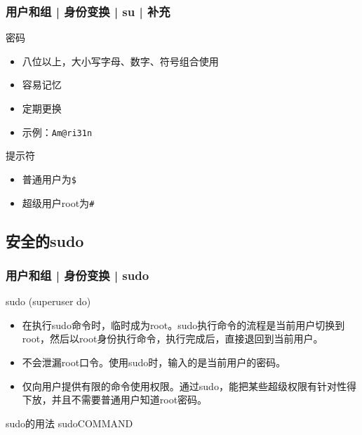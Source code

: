 \begin{frame}[fragile]
  \frametitle{用户和组 | 身份变换 | su | 补充}
  \begin{block}{密码}
    \begin{itemize}
      \item 八位以上，大小写字母、数字、符号组合使用
      \item 容易记忆
      \item 定期更换
      \item 示例：\verb|Am@ri31n|
    \end{itemize}
  \end{block}
  \pause
  \begin{block}{\alert{提示符}}
    \begin{itemize}
      \item 普通用户为\verb|$|
      \item 超级用户root为\verb|#|
    \end{itemize}
  \end{block}
  \begin{figure}
    \centering
  \end{figure}
\end{frame}

\subsection{安全的sudo}
\begin{frame}
  \frametitle{用户和组 | 身份变换 | sudo}
  \begin{block}{sudo (superuser do)}
    \begin{itemize}
      \item 在执行sudo命令时，临时成为root。sudo执行命令的流程是当前用户切换到root，然后以root身份执行命令，执行完成后，直接退回到当前用户。
      \item 不会泄漏root口令。使用sudo时，输入的是当前用户的密码。
      \item 仅向用户提供有限的命令使用权限。通过sudo，能把某些超级权限有针对性得下放，并且不需要普通用户知道root密码。
    \end{itemize}
  \end{block}
  \pause
  \begin{block}{sudo的用法}
    \alert{sudo\quad COMMAND}
  \end{block}
\end{frame}

